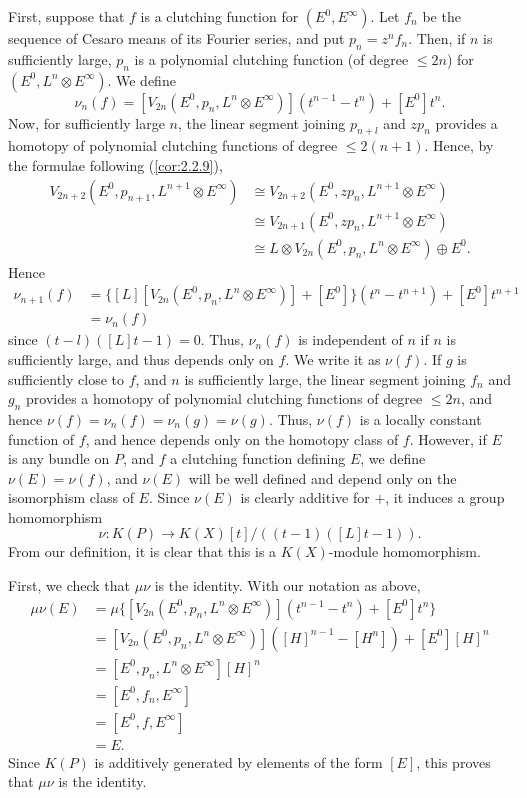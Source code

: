 First, suppose that $f$ is a clutching function for $(E^0, E^\infty)$. Let $f_n$ be the sequence of Cesaro means of its Fourier series, and put $p_n = z^n f_n$. Then, if $n$ is sufficiently large, $p_n$ is a polynomial clutching function (of degree $\leq 2n$) for $(E^0, L^n \otimes E^\infty)$. We define
\begin{equation*}
    \nu_n(f) = [V_{2n}(E^0, p_n, L^n \otimes E^\infty)](t^{n-1} - t^n) + [E^0]t^n .
\end{equation*}
Now, for sufficiently large $n$, the linear segment joining $p_{n+l}$ and $zp_n$ provides a homotopy of polynomial clutching functions of degree $\leq 2(n + 1)$. Hence, by the formulae following (\ref{cor:2.2.9}),
\begin{align*}
    V_{2n+2}(E^0, p_{n+1}, L^{n+1} \otimes E^\infty) &\cong V_{2n+2}(E^0, zp_n, L^{n+1} \otimes E^\infty) \\
    &\cong V_{2n+1}(E^0, zp_n, L^{n+1} \otimes E^\infty) \\
    &\cong L \otimes V_{2n}(E^0, p_n, L^n \otimes E^\infty) \oplus E^0 .
\end{align*}
Hence
\begin{align*}
    \nu_{n+1}(f) &= \{[L] [V_{2n}(E^0, p_n, L^n \otimes E^\infty)] + [E^0] \}(t^n - t^{n+1}) + [E^0]t^{n+1} \\
    &= \nu_n(f)
\end{align*}
since $(t - l)([L]t - 1) = 0$. Thus, $\nu_n(f)$ is independent of $n$ if $n$ is sufficiently large, and thus depends only on $f$. We write it as $\nu(f)$. If $g$ is sufficiently close to $f$, and $n$ is sufficiently large, the linear segment joining $f_n$ and $g_n$ provides a homotopy of polynomial clutching functions of degree $\leq 2n$, and hence $\nu(f) = \nu_n(f) = \nu_n(g) = \nu(g)$. Thus, $\nu(f)$ is a locally constant function of $f$, and hence depends only on the homotopy class of $f$. However, if $E$ is any bundle on $P$, and $f$ a clutching function defining $E$, we define $\nu(E) = \nu(f)$, and $\nu(E)$ will be well defined and depend only on the isomorphism class of $E$. Since $\nu(E)$ is clearly additive for $+$, it induces a group homomorphism
\begin{equation*}
    \nu: K(P) \to K(X)[t] / ((t-1)([L]t-1)) .
\end{equation*}
From our definition, it is clear that this is a $K(X)$-module homomorphism. \par 

First, we check that $\mu \nu$ is the identity. With our notation as above,
\begin{align*}
    \mu\nu(E) &= \mu\{[V_{2n}(E^0, p_n, L^n \otimes E^\infty)](t^{n-1} - t^n) + [E^0]t^n \} \\
    &= [V_{2n}(E^0, p_n, L^n \otimes E^\infty)]([H]^{n-1} - [H^n]) + [E^0][H]^n \\
    &= [E^0, p_n, L^n \otimes E^\infty] [H]^n \\
    &= [E^0, f_n, E^\infty] \\
    &= [E^0, f, E^\infty] \\
    &= E .
\end{align*}
Since $K(P)$ is additively generated by elements of the form $[E]$, this proves that $\mu\nu$ is the identity. \par 


